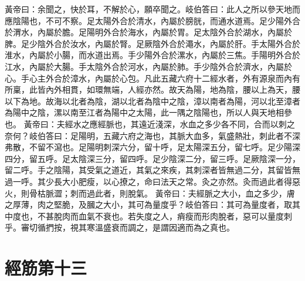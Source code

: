 黃帝曰：余聞之，快於耳，不解於心，願卒聞之。岐伯答曰：此人之所以參天地而應陰陽也，不可不察。足太陽外合於清水，內屬於膀胱，而通水道焉。足少陽外合於渭水，內屬於膽。足陽明外合於海水，內屬於胃。足太陰外合於湖水，內屬於脾。足少陰外合於汝水，內屬於腎。足厥陰外合於澠水，內屬於肝。手太陽外合於淮水，內屬於小腸，而水道出焉。手少陽外合於漯水，內屬於三焦。手陽明外合於江水，內屬於大腸。手太陰外合於河水，內屬於肺。手少陰外合於濟水，內屬於心。手心主外合於漳水，內屬於心包。凡此五藏六府十二經水者，外有源泉而內有所稟，此皆內外相貫，如環無端，人經亦然。故天為陽，地為陰，腰以上為天，腰以下為地。故海以北者為陰，湖以北者為陰中之陰，漳以南者為陽，河以北至漳者為陽中之陰，漯以南至江者為陽中之太陽，此一隅之陰陽也，所以人與天地相參也。
黃帝曰：夫經水之應經脈也，其遠近淺深，水血之多少各不同，合而以刺之奈何？岐伯答曰：足陽明，五藏六府之海也，其脈大血多，氣盛熱壯，刺此者不深弗散，不留不瀉也。足陽明刺深六分，留十呼，足太陽深五分，留七呼。足少陽深四分，留五呼。足太陰深三分，留四呼。足少陰深二分，留三呼。足厥陰深一分，留二呼。手之陰陽，其受氣之道近，其氣之來疾，其刺深者皆無過二分，其留皆無過一呼。其少長大小肥瘦，以心撩之，命曰法天之常。灸之亦然。灸而過此者得惡火，則骨枯脈澀；刺而過此者，則脫氣。
黃帝曰：夫經脈之大小，血之多少，膚之厚薄，肉之堅脆，及膕之大小，其可為量度乎？岐伯答曰：其可為量度者，取其中度也，不甚脫肉而血氣不衰也。若失度之人，痟瘦而形肉脫者，惡可以量度刺乎。審切循捫按，視其寒溫盛衰而調之，是謂因適而為之真也。

\section{經筋第十三}

